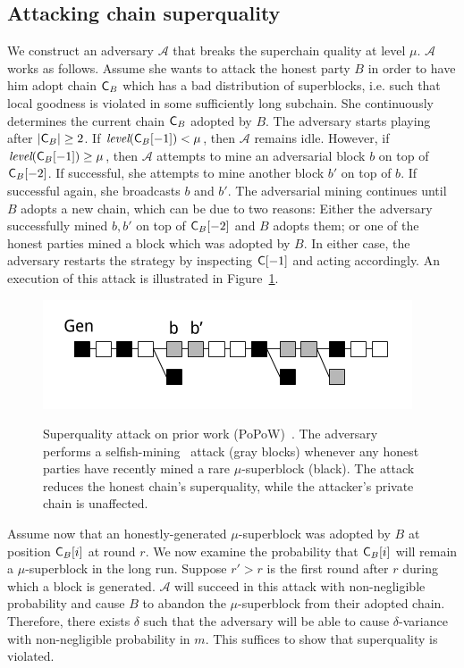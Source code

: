 \subsection{Attacking chain superquality}
\label{subsec:superquality-attack}
We construct an adversary $\mathcal{A}$ that breaks the superchain quality at level $\mu$.
$\mathcal{A}$ works as follows. Assume she wants to attack the honest party $B$
in order to have him adopt chain $\mathsf{C}_B$ which has a bad distribution of
superblocks, i.e. such that local goodness is violated in some sufficiently long
subchain. She continuously determines the current chain $\mathsf{C}_B$ adopted by
$B$. The adversary starts playing after $|\mathsf{C}_B| \geq 2$. If
$\emph{level}(\mathsf{C}_B[-1]) < \mu$, then $\mathcal{A}$ remains idle. However,
if $\emph{level}(\mathsf{C}_B[-1]) \geq \mu$, then $\mathcal{A}$ attempts to mine
an adversarial block $b$ on top of $\mathsf{C}_B[-2]$. If successful,  she attempts
to mine another block $b'$ on top of $b$. If successful again, she broadcasts
$b$ and $b'$. The adversarial mining continues until $B$ adopts a new chain,
which can be due to two reasons: Either the adversary successfully mined $b, b'$
on top of $\mathsf{C}_B[-2]$ and $B$ adopts them; or one of the honest parties mined
a block which was adopted by $B$. In either case, the adversary restarts
the strategy by inspecting $\mathsf{C}[-1]$ and acting accordingly. An execution of
this attack is illustrated in Figure~\ref{fig.superquality-attack}.

\begin{figure}[h]
    \caption{Superquality attack on prior work (PoPoW)~\cite{popow}.
    The adversary performs a selfish-mining~\cite{selfish} attack (gray blocks)
    whenever any honest parties have recently mined a rare $\mu$-superblock
    (black). The attack reduces the honest chain's superquality, while the
    attacker's private chain is unaffected. }
    \centering
    \includegraphics[width=0.5 \columnwidth,keepaspectratio]{chapters/work/figures/superquality-attack-popow.png}
    \label{fig.superquality-attack}
\end{figure}

Assume now that an honestly-generated $\mu$-superblock was adopted by $B$ at
position $\mathsf{C}_B[i]$ at round $r$. We now examine the probability that
$\mathsf{C}_B[i]$ will remain a $\mu$-superblock in the long run. Suppose $r' > r$
is the first round after $r$ during which a block is generated. $\mathcal{A}$
will succeed in this attack with non-negligible probability and cause $B$ to
abandon the $\mu$-superblock from their adopted chain. Therefore, there
exists $\delta$ such that the adversary will be able to cause $\delta$-variance
with non-negligible probability in $m$. This suffices to show that superquality
is violated.

